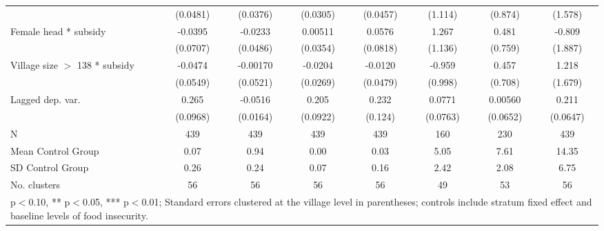 \begin{table}[htbp]
\begin{tabular}{l*{7}{c}}
                    &    (0.0481)         &    (0.0376)         &    (0.0305)         &    (0.0457)         &     (1.114)         &     (0.874)         &     (1.578)         \\
[1em]
Female head * subsidy&     -0.0395         &     -0.0233         &     0.00511         &      0.0576         &       1.267         &       0.481         &      -0.809         \\
                    &    (0.0707)         &    (0.0486)         &    (0.0354)         &    (0.0818)         &     (1.136)         &     (0.759)         &     (1.887)         \\
[1em]
Village size $>$ 138 * subsidy&     -0.0474         &    -0.00170         &     -0.0204         &     -0.0120         &      -0.959         &       0.457         &       1.218         \\
                    &    (0.0549)         &    (0.0521)         &    (0.0269)         &    (0.0479)         &     (0.998)         &     (0.708)         &     (1.679)         \\
[1em]
Lagged dep. var.    &       0.265\sym{***}&     -0.0516\sym{***}&       0.205\sym{**} &       0.232\sym{*}  &      0.0771         &     0.00560         &       0.211\sym{***}\\
                    &    (0.0968)         &    (0.0164)         &    (0.0922)         &     (0.124)         &    (0.0763)         &    (0.0652)         &    (0.0647)         \\
\hline
N                   &         439         &         439         &         439         &         439         &         160         &         230         &         439         \\
Mean Control Group  &        0.07         &        0.94         &        0.00         &        0.03         &        5.05         &        7.61         &       14.35         \\
SD Control Group    &        0.26         &        0.24         &        0.07         &        0.16         &        2.42         &        2.08         &        6.75         \\
No. clusters        &          56         &          56         &          56         &          56         &          49         &          53         &          56         \\
\hline\hline
\multicolumn{8}{l}{\footnotesize * p$<$0.10, ** p$<$0.05, *** p$<$0.01; Standard errors clustered at the village level in parentheses; controls include stratum fixed effect and baseline levels of food insecurity.}\\
\end{tabular}
\end{table}
